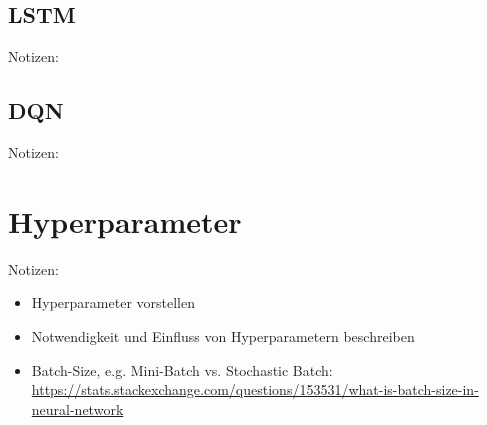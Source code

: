\subsection{LSTM}
Notizen:


\subsection{DQN}
Notizen:


\section{Hyperparameter}
Notizen:
\begin{itemize}
	\item Hyperparameter vorstellen
	\item Notwendigkeit und Einfluss von Hyperparametern beschreiben
	\item Batch-Size, e.g. Mini-Batch vs. Stochastic Batch: \url{https://stats.stackexchange.com/questions/153531/what-is-batch-size-in-neural-network}
\end{itemize}
